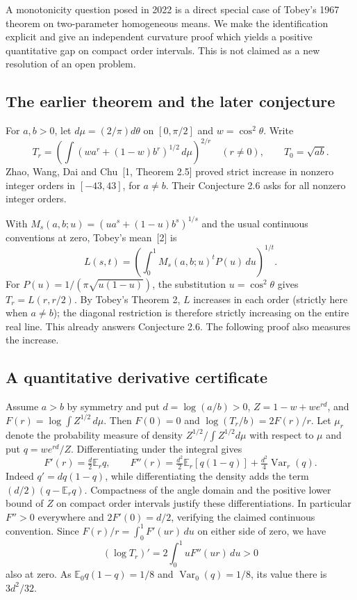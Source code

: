 \documentclass[11pt,a4paper]{article}
\numberwithin{equation}{section}
\theoremstyle{definition}
\theoremstyle{remark}
\newenvironment{sectionabstract}{\par\smallskip\begingroup\small\noindent}{\par\endgroup\medskip}
\begin{document}
\begin{sectionabstract}
A monotonicity question posed in 2022 is a direct special case of Tobey's
1967 theorem on two-parameter homogeneous means. We make the
identification explicit and give an independent curvature proof
which yields a positive quantitative gap on compact order intervals.
This is not claimed as a new resolution of an open problem.
\end{sectionabstract}
\subsection*{The earlier theorem and the later conjecture}
For $a,b>0$, let $d\mu=(2/\pi)d\theta$ on $[0,\pi/2]$ and $w=\cos^2\theta$.
Write
\[
T_r=\left(\int (wa^r+(1-w)b^r)^{1/2}\,d\mu\right)^{2/r}
\quad (r\ne0),\qquad T_0=\sqrt{ab}.
\]
Zhao, Wang, Dai and Chu~[1, Theorem 2.5] proved strict increase in
nonzero integer orders in $[-43,43]$, for $a\ne b$. Their
Conjecture 2.6 asks for all nonzero integer orders.

With $M_s(a,b;u)=(ua^s+(1-u)b^s)^{1/s}$ and the usual continuous
conventions at zero, Tobey's mean~[2] is
\[
L(s,t)=\left(\int_0^1 M_s(a,b;u)^t P(u)\,du\right)^{1/t}.
\]
For $P(u)=1/(\pi\sqrt{u(1-u)})$, the substitution $u=\cos^2\theta$
gives $T_r=L(r,r/2)$. By Tobey's Theorem 2, $L$ increases in each
order (strictly here when $a\ne b$); the diagonal restriction is
therefore strictly increasing on the entire real line. This already
answers Conjecture 2.6. The following proof also measures the increase.

\subsection*{A quantitative derivative certificate}
Assume $a>b$ by symmetry and put $d=\log(a/b)>0$, $Z=1-w+w e^{rd}$,
and $F(r)=\log\int Z^{1/2}\,d\mu$. Then $F(0)=0$ and
$\log(T_r/b)=2F(r)/r$. Let $\mu_r$ denote the probability measure
of density $Z^{1/2}/\int Z^{1/2}d\mu$ with respect to $\mu$ and put
$q=w e^{rd}/Z$. Differentiating under the integral gives
\[
F'(r)=\tfrac d2\mathbb E_r q,\qquad
F''(r)=\tfrac{d^2}{2}\mathbb E_r[q(1-q)]
+\tfrac{d^2}{4}\operatorname{Var}_r(q).
\]
Indeed $q'=dq(1-q)$, while differentiating the density adds the
term $(d/2)(q-\mathbb E_r q)$. Compactness of the angle domain and
the positive lower bound of $Z$ on compact order intervals justify
these differentiations. In particular $F''>0$ everywhere and
$2F'(0)=d/2$, verifying the claimed continuous convention.
Since $F(r)/r=\int_0^1F'(ur)\,du$ on either side of zero, we have
\[
(\log T_r)'=2\int_0^1 uF''(ur)\,du>0
\]
also at zero. As $\mathbb E_0q(1-q)=1/8$ and
$\operatorname{Var}_0(q)=1/8$, its value there is $3d^2/32$.
\end{document}
